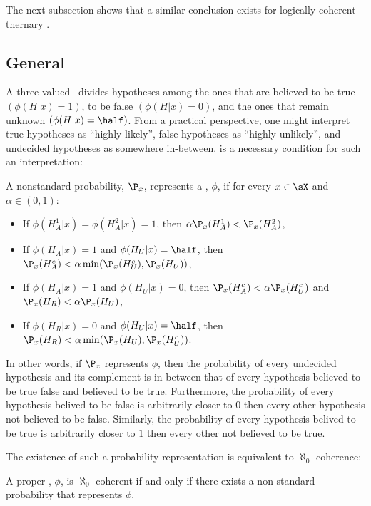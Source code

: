 The next subsection shows that
a similar conclusion exists
for logically-coherent 
thernary \summs.

\subsection{General \summs}
\label{sec:coherent_agnostic}

A three-valued \summ\ divides 
hypotheses among
the ones that are believed to be true
$(\phi(H|x) = 1)$, 
to be false
$(\phi(H|x) = 0)$,
and the ones that remain unknown
$(\phi(H|x) = \half)$.
From a practical perspective, 
one might interpret 
true hypotheses as ``highly likely'',
false hypotheses as ``highly unlikely'', and
undecided hypotheses as somewhere in-between.
 is a necessary condition for
such an interpretation:

\begin{definition}
 \label{def:rep}
 A nonstandard probability, $\P_x$, 
 represents a \summ, $\phi$, if
 for every $x \in \sX$ and $\alpha \in (0,1)$:
 \begin{itemize}
  \item If $\phi(H_A^1|x) = \phi(H_A^2|x) = 1$,
  then $\alpha\P_x(H_A^1) < \P_x(H_A^2)$,
  \item If $\phi(H_A|x) = 1$ and 
  $\phi(H_U|x) = \half$, then
  $\P_x(H_A^c) < 
  \alpha \min(\P_x(H_U^c), \P_x(H_U))$,
  \item If $\phi(H_A|x) = 1$ and 
  $\phi(H_U|x) = 0$, then
  $\P_x(H_A^c) < 
  \alpha \P_x(H_U^c)$ and
  $\P_x(H_R) < \alpha \P_x(H_U)$,
  \item  If $\phi(H_R|x) = 0$ and
  $\phi(H_U|x) = \half$, then
  $\P_x(H_R) 
  < \alpha \min(\P_x(H_U),\P_x(H_U^c))$.
 \end{itemize}
\end{definition}

In other words, if $\P_x$ represents $\phi$,
then the probability of 
every undecided hypothesis and its complement is
in-between that of every hypothesis
believed to be true false and 
believed to be true.
Furthermore, the probability of every
hypothesis belived to be false is 
arbitrarily closer to $0$
then every other hypothesis 
not believed to be false.
Similarly,
the probability of every hypothesis
belived to be true
is arbitrarily closer to $1$ then 
every other not believed to be true.

The existence of such a probability representation
is equivalent to $\aleph_0$-coherence:

\begin{theorem}
 \label{thm:coherence-nonstd}
 A proper \summ, $\phi$, is 
 $\aleph_0$-coherent
 if and only if
 there exists a non-standard probability
 that represents $\phi$. 
\end{theorem}

